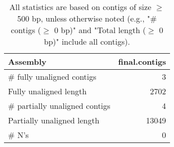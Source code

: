 \documentclass[12pt,a4paper]{article}
\begin{document}
\begin{table}[ht]
\begin{center}
\caption{All statistics are based on contigs of size $\geq$ 500 bp, unless otherwise noted (e.g., "\# contigs ($\geq$ 0 bp)" and "Total length ($\geq$ 0 bp)" include all contigs).}
\begin{tabular}{|l*{1}{|r}|}
\hline
Assembly & final.contigs \\ \hline
\# fully unaligned contigs & 3 \\ \hline
Fully unaligned length & 2702 \\ \hline
\# partially unaligned contigs & 4 \\ \hline
Partially unaligned length & 13049 \\ \hline
\# N's & 0 \\ \hline
\end{tabular}
\end{center}
\end{table}
\end{document}
